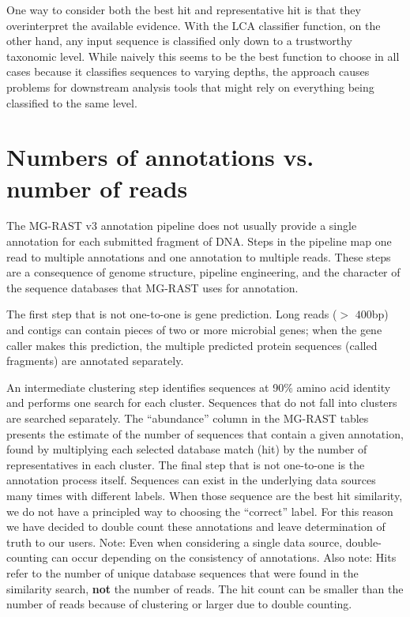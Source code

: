 \documentclass[12pt,fullpage]{report}
\begin{document}
One way to consider both the best hit and representative hit is that they overinterpret the available evidence. With the LCA classifier function, on the other hand, any input sequence is classified only down to a trustworthy taxonomic level. While naively this seems to be the best function to choose in all cases because it classifies sequences to varying depths, the approach causes problems for downstream analysis tools that might rely on everything being classified to the same level.
\section{Numbers of annotations vs. number of reads}
\label{section:annotation_numbers}
The MG-RAST v3 annotation pipeline does not usually provide a single annotation for each submitted fragment of DNA. Steps in the pipeline map one read to multiple annotations and one annotation to multiple reads. These steps are a consequence of genome structure, pipeline engineering, and the character of the sequence databases that MG-RAST uses for annotation.

The first step that is not one-to-one is gene prediction. Long reads ($>$ $400$bp) and contigs can contain pieces of two or more microbial genes; when the gene caller makes this prediction, the multiple predicted protein sequences (called fragments) are annotated separately.

An intermediate clustering step identifies sequences at 90\% amino acid identity and performs one search for each cluster. Sequences that do not fall into clusters are searched separately. The ``abundance'' column in the MG-RAST tables presents the estimate of the number of sequences that contain a given annotation, found by multiplying each selected database match (hit) by the number of representatives in each cluster.
The final step that is not one-to-one is the annotation process itself. Sequences can exist in the underlying data sources many times with different labels. When those sequence are the best hit similarity, we do not have a principled way to choosing the ``correct'' label. For this reason we have decided to double count these annotations and leave determination of truth to our users. Note: Even when considering a single data source, double-counting can occur depending on the consistency of annotations.
Also note: Hits refer to the number of unique database sequences that were found in the similarity search, {\bf not} the number of reads. The hit count can be smaller than the number of reads because of clustering or larger due to double counting.
\end{document}
